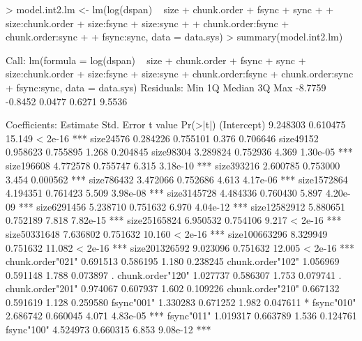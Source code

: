 \documentclass[11pt]{article}
\begin{document}
\begin{Schunk}
\begin{Sinput}
> model.int2.lm <- lm(log(dspan) ~ size + chunk.order + fsync + sync
+                 + size:chunk.order + size:fsync + size:sync
+                 + chunk.order:fsync + chunk.order:sync
+                 + fsync:sync, data = data.sys)
> summary(model.int2.lm)
\end{Sinput}
\begin{Soutput}
Call:
lm(formula = log(dspan) ~ size + chunk.order + fsync + sync + 
    size:chunk.order + size:fsync + size:sync + chunk.order:fsync + 
    chunk.order:sync + fsync:sync, data = data.sys)
Residuals:
    Min      1Q  Median      3Q     Max 
-8.7759 -0.8452  0.0477  0.6271  9.5536 

Coefficients:
                                Estimate Std. Error t value Pr(>|t|)    
(Intercept)                     9.248303   0.610475  15.149  < 2e-16 ***
size24576                       0.284226   0.755101   0.376 0.706646    
size49152                       0.958623   0.755895   1.268 0.204845    
size98304                       3.289824   0.752936   4.369 1.30e-05 ***
size196608                      4.772578   0.755747   6.315 3.18e-10 ***
size393216                      2.600785   0.753000   3.454 0.000562 ***
size786432                      3.472066   0.752686   4.613 4.17e-06 ***
size1572864                     4.194351   0.761423   5.509 3.98e-08 ***
size3145728                     4.484336   0.760430   5.897 4.20e-09 ***
size6291456                     5.238710   0.751632   6.970 4.04e-12 ***
size12582912                    5.880651   0.752189   7.818 7.82e-15 ***
size25165824                    6.950532   0.754106   9.217  < 2e-16 ***
size50331648                    7.636802   0.751632  10.160  < 2e-16 ***
size100663296                   8.329949   0.751632  11.082  < 2e-16 ***
size201326592                   9.023096   0.751632  12.005  < 2e-16 ***
chunk.order"021"                0.691513   0.586195   1.180 0.238245    
chunk.order"102"                1.056969   0.591148   1.788 0.073897 .  
chunk.order"120"                1.027737   0.586307   1.753 0.079741 .  
chunk.order"201"                0.974067   0.607937   1.602 0.109226    
chunk.order"210"                0.667132   0.591619   1.128 0.259580    
fsync"001"                      1.330283   0.671252   1.982 0.047611 *  
fsync"010"                      2.686742   0.660045   4.071 4.83e-05 ***
fsync"011"                      1.019317   0.663789   1.536 0.124761    
fsync"100"                      4.524973   0.660315   6.853 9.08e-12 ***

\end{Soutput}
\end{Schunk}
\end{document}
